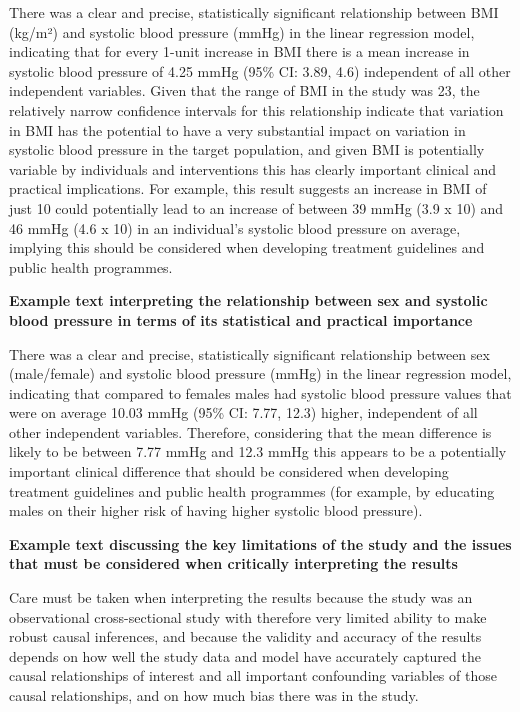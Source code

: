 \documentclass[
]{book}
\begin{document}
There was a clear and precise, statistically significant relationship between BMI (kg/m²) and systolic blood pressure (mmHg) in the linear regression model, indicating that for every 1-unit increase in BMI there is a mean increase in systolic blood pressure of 4.25 mmHg (95\% CI: 3.89, 4.6) independent of all other independent variables. Given that the range of BMI in the study was 23, the relatively narrow confidence intervals for this relationship indicate that variation in BMI has the potential to have a very substantial impact on variation in systolic blood pressure in the target population, and given BMI is potentially variable by individuals and interventions this has clearly important clinical and practical implications. For example, this result suggests an increase in BMI of just 10 could potentially lead to an increase of between 39 mmHg (3.9 x 10) and 46 mmHg (4.6 x 10) in an individual's systolic blood pressure on average, implying this should be considered when developing treatment guidelines and public health programmes.

\textbf{Example text interpreting the relationship between sex and systolic blood pressure in terms of its statistical and practical importance}

There was a clear and precise, statistically significant relationship between sex (male/female) and systolic blood pressure (mmHg) in the linear regression model, indicating that compared to females males had systolic blood pressure values that were on average 10.03 mmHg (95\% CI: 7.77, 12.3) higher, independent of all other independent variables. Therefore, considering that the mean difference is likely to be between 7.77 mmHg and 12.3 mmHg this appears to be a potentially important clinical difference that should be considered when developing treatment guidelines and public health programmes (for example, by educating males on their higher risk of having higher systolic blood pressure).

\textbf{Example text discussing the key limitations of the study and the issues that must be considered when critically interpreting the results}

Care must be taken when interpreting the results because the study was an observational cross-sectional study with therefore very limited ability to make robust causal inferences, and because the validity and accuracy of the results depends on how well the study data and model have accurately captured the causal relationships of interest and all important confounding variables of those causal relationships, and on how much bias there was in the study.
\end{document}
